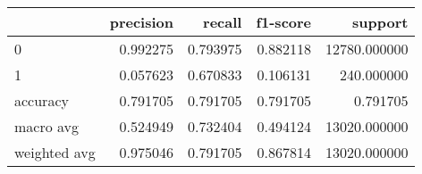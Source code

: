 \begin{tabular}{lrrrr}
\toprule
{} &  precision &    recall &  f1-score &       support \\
\midrule
0            &   0.992275 &  0.793975 &  0.882118 &  12780.000000 \\
1            &   0.057623 &  0.670833 &  0.106131 &    240.000000 \\
accuracy     &   0.791705 &  0.791705 &  0.791705 &      0.791705 \\
macro avg    &   0.524949 &  0.732404 &  0.494124 &  13020.000000 \\
weighted avg &   0.975046 &  0.791705 &  0.867814 &  13020.000000 \\
\bottomrule
\end{tabular}
